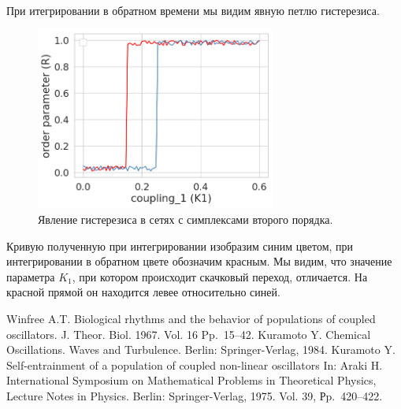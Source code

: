 При итегрировании в обратном времени мы видим явную петлю гистерезиса.
\begin{figure}
\center\includegraphics[height=6cm]{aRyabovris1.png}
 \caption{Явление гистерезиса в сетях с симплексами второго порядка.}
\end{figure}

Кривую полученную при интегрировании изобразим синим цветом, при интегрировании в обратном цвете обозначим красным. 
Мы видим, что значение параметра $K_1$, при котором происходит скачковый переход, отличается. На красной прямой он находится левее относительно синей. 


\begin{thebibliography}{99}
 Winfree A.T.  { Biological rhythms and the behavior of populations of coupled oscillators}.   J. Theor. Biol. 1967. Vol. 16  Pp.~15--42.
Kuramoto Y. Chemical Oscillations. Waves and Turbulence. Berlin: Springer-Verlag, 1984.
 Kuramoto Y. {   Self-entrainment of a population of coupled non-linear oscillators In: Araki H}. International Symposium on Mathematical Problems in Theoretical Physics, Lecture Notes in Physics. Berlin: Springer-Verlag, 1975. Vol. 39, Рp.~420--422.
\end{thebibliography}





%

